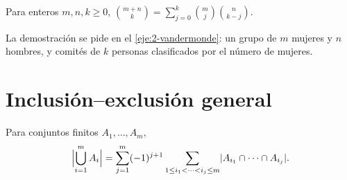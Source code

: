 \addtocounter{definicion}{1}%

\begin{proposicion}\label{prop:t2-vandermonde}
Para enteros $m,n,k\ge0$, $\displaystyle\binom{m+n}{k}=\sum_{j=0}^{k}\binom{m}{j}\binom{n}{k-j}$.
\end{proposicion}

La demostración se pide en el \cref{eje:2-vandermonde}: un grupo de $m$ mujeres y $n$ hombres, y comités de $k$ personas clasificados por el número de mujeres.

\section{Inclusión--exclusión general}

\begin{teorema}\label{teo:t2-ie}
Para conjuntos finitos $A_1,\dots,A_m$,
\[
\Bigl|\bigcup_{i=1}^{m}A_i\Bigr|=\sum_{j=1}^{m}(-1)^{j+1}\sum_{1\le i_1<\dots<i_j\le m}\lvert A_{i_1}\cap\dots\cap A_{i_j}\rvert.
\]
\end{teorema}

\addtocounter{definicion}{1}%

\addtocounter{definicion}{1}%

\addtocounter{definicion}{1}%

